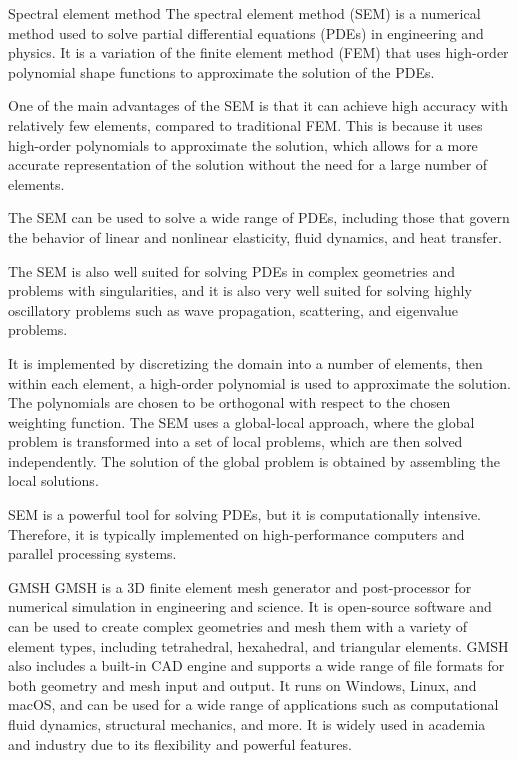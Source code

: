 \documentclass[10pt,aspectratio=169,dvipsnames]{beamer} %
\begin{document}
	\begin{frame}{Spectral element method}
		\noindent\footnotesize
		The spectral element method (SEM) is a numerical method used to solve partial differential equations (PDEs) in engineering and physics. 
		It is a variation of the finite element method (FEM) that uses high-order polynomial shape functions to approximate the solution of the PDEs.
		
		One of the main advantages of the SEM is that it can achieve high accuracy with relatively few elements, compared to traditional FEM.
		This is because it uses high-order polynomials to approximate the solution, which allows for a more accurate representation of the solution without the need for a large number of elements.
		
		The SEM can be used to solve a wide range of PDEs, including those that govern the behavior of linear and nonlinear elasticity, fluid dynamics, and heat transfer.
		
		The SEM is also well suited for solving PDEs in complex geometries and problems with singularities, and it is also very well suited for solving highly oscillatory problems such as wave propagation, scattering, and eigenvalue problems.
		
		It is implemented by discretizing the domain into a number of elements, then within each element, a high-order polynomial is used to approximate the solution. 
		The polynomials are chosen to be orthogonal with respect to the chosen weighting function. 
		The SEM uses a global-local approach, where the global problem is transformed into a set of local problems, which are then solved independently. The solution of the global problem is obtained by assembling the local solutions.
		
		SEM is a powerful tool for solving PDEs, but it is computationally intensive. Therefore, it is typically implemented on high-performance computers and parallel processing systems.
	\end{frame}
	\begin{frame}{GMSH}
		GMSH is a 3D finite element mesh generator and post-processor for numerical simulation in engineering and science. It is open-source software and can be used to create complex geometries and mesh them with a variety of element types, including tetrahedral, hexahedral, and triangular elements. GMSH also includes a built-in CAD engine and supports a wide range of file formats for both geometry and mesh input and output. It runs on Windows, Linux, and macOS, and can be used for a wide range of applications such as computational fluid dynamics, structural mechanics, and more. It is widely used in academia and industry due to its flexibility and powerful features.
	\end{frame}
\end{document}
